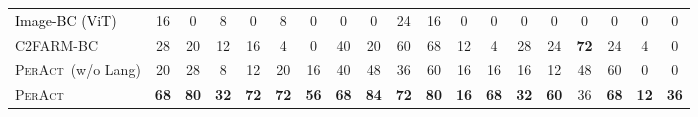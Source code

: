\documentclass{article}
\newcommand{\bczvit}{Image-BC (ViT)~}
\newcommand{\unet}{C2FARM-BC~}
\newcommand{\highlight}[1]{\textcolor{black}{#1}}
\newcommand{\model}{\textsc{PerAct}}
\begin{document}
\begin{table}[!t]
\begin{tabular}{lcccccccccccccccccc}
\highlight{\bczvit}   & 16                   & 0                                                  & 8                    & 0                                                  & 8                    & 0                                                       & 0                    & 0                                                     & 24                   & 16                                               & 0                    & 0                                                    & 0                    & 0                                                & 0                    & 0                                                 & 0                    & 0                                                   \\
\unet            & 28                   & 20                                                     & 12                   & 16                                                           & 4                    & 0                                                        & 40                   & 20                                                         & 60                   & 68                                               & 12                   & 4                                                        & 28          & 24                                                      & \textbf{72}          & 24                                                    & 4                    & 0                                                   \\
\model~(w/o Lang) & 20                   & 28                                                     & 8                    & 12                                                           & 20                   & 16                                                       & 40                   & 48                                                         & 36                   & 60                                               & 16                   & 16                                                       & 16                   & 12                                                      & 48                   & 60                                                    & 0                    & 0                                                   \\
\rowcolor[rgb]{0.9,1.0,0.9}\model           & \textbf{68}          & \textbf{80}                                            & \textbf{32}          & \textbf{72}                                                  & \textbf{72}          & \textbf{56}                                              & \textbf{68}          & \textbf{84}                                                & \textbf{72}          & \textbf{80}                                      & \textbf{16}          & \textbf{68}                                              & \textbf{32}          & \textbf{60}                                             & 36                   & \textbf{68}                                           & \textbf{12}          & \textbf{36}                                         \\[1pt]  

\end{tabular}
\end{table}
\end{document}
